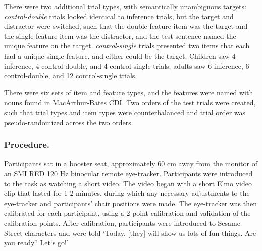 \documentclass[10pt,letterpaper]{article}
\begin{document}
There were two additional trial types, with semantically unambiguous targets: \emph{control-double} trials looked identical to inference trials, but the target and distractor were switched, such that the double-feature item was the target and the single-feature item was the distractor, and the test sentence named the unique feature on the target. \emph{control-single} trials presented two items that each had a unique single feature, and either could be the target. Children saw 4 inference, 4 control-double, and 4 control-single trials; adults saw 6 inference, 6 control-double, and 12 control-single trials. 


There were six sets of item and feature types, and the features were named with nouns found in MacArthur-Bates CDI. Two orders of the test trials were created, such that trial types and item types were counterbalanced and trial order was pseudo-randomized across the two orders.

\vspace{12pt}

\subsubsection{Procedure.}

Participants sat in a booster seat, approximately 60 cm away from the monitor of an SMI RED 120 Hz binocular remote eye-tracker. Participants were introduced to the task as watching a short video. The video began with a short Elmo video clip that lasted for 1-2 minutes, during which any necessary adjustments to the eye-tracker and participants' chair positions were made. The eye-tracker was then calibrated for each participant, using a 2-point calibration and validation of the calibration points. After calibration, participants were introduced to Sesame Street characters and were told `Today, [they] will show us lots of fun things. Are you ready? Let`s go!'
\end{document}
